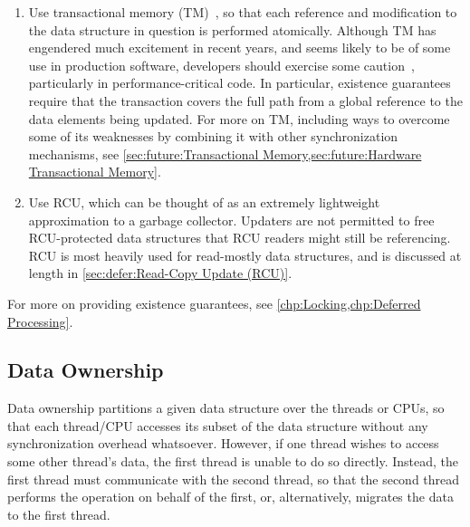 {\begin{enumerate}
	\item	Use transactional memory
		(TM)~\cite{Herlihy93a,DBLomet1977SIGSOFT,Shavit95},
		so that each reference and
		modification to the data structure in question is
		performed atomically.
		Although TM has engendered much excitement in recent years,
		and seems likely to be of some use in production software,
		developers should exercise some
		caution~\cite{Blundell2005DebunkTM,Blundell2006TMdeadlock,McKenney2007PLOSTM},
		particularly in performance-critical code.
		In particular, existence guarantees require that the
		transaction covers the full path from a global reference
		to the data elements being updated.
		For more on TM, including ways to overcome some of its
		weaknesses by combining it with other synchronization
		mechanisms, see
		\cref{sec:future:Transactional Memory,sec:future:Hardware Transactional Memory}.
	\item	Use RCU, which can be thought of as an extremely lightweight
		approximation to a garbage collector.
		Updaters are not permitted to free RCU-protected
		data structures that RCU readers might still be referencing.
		RCU is most heavily used for read-mostly data structures,
		and is discussed at length in
		\cref{sec:defer:Read-Copy Update (RCU)}.
	\end{enumerate}

	For more on providing existence guarantees, see
	\cref{chp:Locking,chp:Deferred Processing}.
}\QuickQuizEnd

\subsection{Data Ownership}
\label{sec:SMPdesign:Data Ownership}

Data ownership partitions a given data structure over the threads
or CPUs, so that each thread/CPU accesses its subset of the data
structure without any synchronization overhead whatsoever.
However, if one thread wishes to access some other thread's data,
the first thread is unable to do so directly.
Instead, the first thread must communicate with the second thread,
so that the second thread performs the operation on behalf of the
first, or, alternatively, migrates the data to the first thread.

